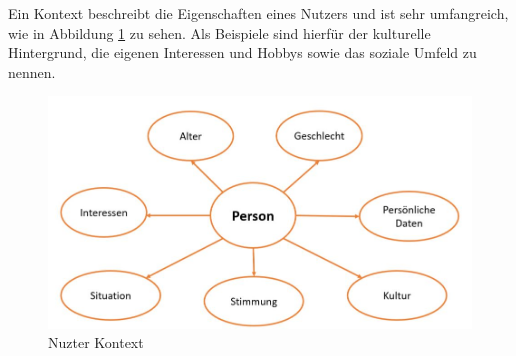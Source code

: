 Ein Kontext beschreibt die Eigenschaften eines Nutzers und ist sehr umfangreich, wie in Abbildung \ref{fig:kontext} zu sehen. Als Beispiele sind hierfür der kulturelle Hintergrund, die eigenen Interessen und Hobbys sowie das soziale Umfeld zu nennen.

\begin{figure}[!h]
	\centering
	\includegraphics[width=1\linewidth]{Picture/Kontext}
	\caption[Nuzter Kontext]{Nuzter Kontext}
	\label{fig:kontext}
\end{figure}





